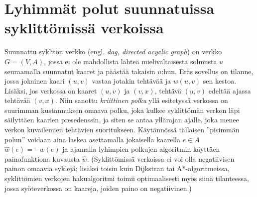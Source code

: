 \documentclass[finnish]{tktltiki2}
\theoremstyle{definition}
\theoremstyle{remark}
\begin{document}
\section{Lyhimmät polut suunnatuissa syklittömissä verkoissa}
Suunnattu syklitön verkko (engl. \textit{dag, directed acyclic graph}) on verkko $G = (V, A)$, jossa ei ole mahdollista lähteä mielivaltaisesta solmusta $u$ seuraamalla suunnatut kaaret ja päästää takaisin $u$:hun. Eräs sovellus on tilanne, jossa jokainen kaari $(u, v)$ vastaa jotakin tehtävää ja $w(u, v)$ sen kestoa. Lisäksi, jos verkossa on kaaret $(u, v)$ ja $(v, x)$, tehtävä $(u, v)$ edeltää ajassa tehtävää $(v, x)$. Niin sanottu \textit{kriittinen polku} yllä esitetyssä verkossa on suurimman kustannuksen omaava polku, joka kulkee syklittömän verkon läpi säilyttäen kaarien presedenssin, ja siten se antaa yllärajan ajalle, joka menee verkon kuvailemien tehtävien suoritukseen. Käytännössä tällaisen ''pisimmän polun'' voidaan aina laskea asettamalla jokaisella kaarella $e \in A$ $\hat{w}(e) = -w(e)$ ja ajamalla lyhimpien polkujen algoritmin käyttäen painofunktiona kuvausta $\hat{w}$. (Syklittömissä verkoissa ei voi olla negatiivisen painon omaavia syklejä; lisäksi toisin kuin Dijkstran tai A$\ast$-algoritmeissa, syklittömien verkojen hakualgoritmi toimii optimaalisesti myös siinä tilanteessa, jossa syöteverkossa on kaareja, joiden paino on negatiivinen.)
\end{document}
